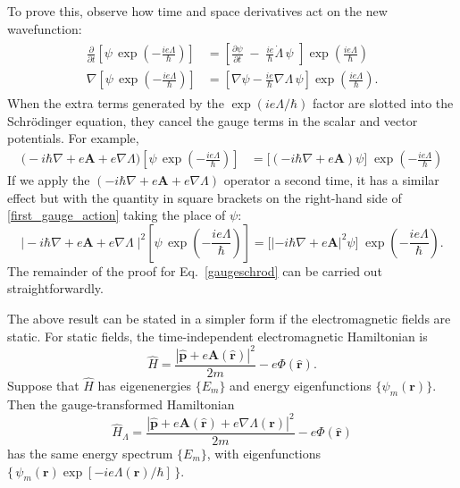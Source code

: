 \documentclass[pra,12pt]{revtex4}
\begin{document}
To prove this, observe how time and space derivatives act on the new
wavefunction:
\begin{align}
  \begin{aligned}
    \frac{\partial}{\partial t} \left[\psi \, \exp\left(-\frac{ie\Lambda}{\hbar}\right)\right] &=
    \left[\frac{\partial\psi}{\partial t} \;-\; \frac{ie}{\hbar} \dot{\Lambda}\, \psi
      \,\, \right] \exp\left(\frac{ie\Lambda}{\hbar}\right)\\
    \nabla \left[\psi \, \exp\left(-\frac{ie\Lambda}{\hbar}\right)\right] &=
    \left[\nabla \psi - \frac{ie}{\hbar} \nabla \Lambda \,\psi \right] \exp\left(\frac{ie\Lambda}{\hbar}\right).
  \end{aligned}
\end{align}
When the extra terms generated by the $\exp(ie\Lambda/\hbar)$ factor
are slotted into the Schr\"odinger equation, they cancel the gauge
terms in the scalar and vector potentials.  For example,
\begin{align}
  \Big(-i\hbar\nabla + e\mathbf{A} + e\nabla\Lambda\Big)
  \left[\psi \, \exp\left(-\frac{ie\Lambda}{\hbar}\right)\right] &=
  \Big[\left(-i\hbar\nabla + e\mathbf{A}\right)\psi\Big]\;
  \exp\left(-\frac{ie\Lambda}{\hbar}\right)
  \label{first_gauge_action}
\end{align}
If we apply the $(-i\hbar\nabla + e\mathbf{A} + e\nabla\Lambda)$
operator a second time, it has a similar effect but with the quantity
in square brackets on the right-hand side of
\eqref{first_gauge_action} taking the place of $\psi$:
\begin{equation}
  \Big|-i\hbar\nabla + e\mathbf{A} + e\nabla\Lambda\;\Big|^2
  \left[\psi \, \exp\left(-\frac{ie\Lambda}{\hbar}\right)\right]  
  =   \Big[\left|-i\hbar\nabla + e\mathbf{A}\right|^2\psi\Big]\;
  \exp\left(-\frac{ie\Lambda}{\hbar}\right).
\end{equation}
The remainder of the proof for Eq.~\eqref{gaugeschrod} can be carried
out straightforwardly.

The above result can be stated in a simpler form if the
electromagnetic fields are static.  For static fields, the
time-independent electromagnetic Hamiltonian is
\begin{equation}
  \hat{H} = \frac{|\hat{\mathbf{p}}+e\mathbf{A}(\hat{\mathbf{r}})|^2}{2m}
  - e\Phi(\hat{\mathbf{r}}).
\end{equation}
Suppose that $\hat{H}$ has eigenenergies $\{E_m \}$ and energy
eigenfunctions $\{\psi_m(\mathbf{r})\}$.  Then the gauge-transformed
Hamiltonian
\begin{equation}
  \hat{H}_\Lambda = \frac{|\hat{\mathbf{p}}+e\mathbf{A}(\hat{\mathbf{r}}) + e\nabla\Lambda(\mathbf{r})|^2}{2m}
  - e\Phi(\hat{\mathbf{r}})
\end{equation}
has the same energy spectrum $\{E_m\}$, with eigenfunctions
$\{\,\psi_m(\mathbf{r}) \exp[-ie\Lambda(\mathbf{r})/\hbar]\,\}$.
\end{document}
